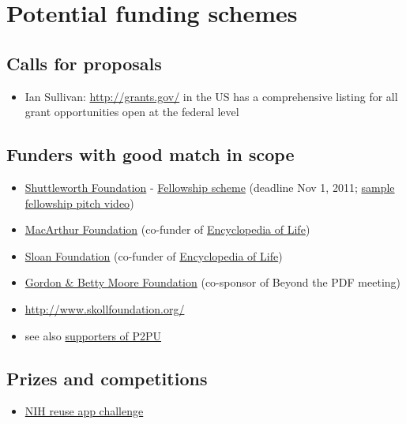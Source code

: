\documentclass[final,authoryear,3p]{elsarticle-open-drafting}
\begin{document}
\section{Potential funding schemes}
\subsection{Calls for proposals}
\begin{itemize}
	\item Ian Sullivan: \href{http://grants.gov/}{http://grants.gov/}  in the US has a comprehensive listing for all grant opportunities open at the federal level
\end{itemize}
\subsection{Funders with good match in scope}
\begin{itemize}
	\item \href{http://www.shuttleworthfoundation.org/}{Shuttleworth Foundation} - \href{http://www.shuttleworthfoundation.org/funding/fellowship-programme/}{Fellowship scheme} (deadline Nov 1, 2011; \href{http://vimeo.com/10401282}{sample fellowship pitch video})
	\item \href{http://www.macfound.org}{MacArthur Foundation} (co-funder of \href{http://www.eol.org/}{Encyclopedia of Life})
	\item \href{http://www.sloan.org/}{Sloan Foundation} (co-funder of \href{http://www.eol.org/}{Encyclopedia of Life})
	\item \href{http://www.moore.org/}{Gordon \& Betty Moore Foundation} (co-sponsor of Beyond the PDF meeting)
	\item \href{http://www.skollfoundation.org/}{http://www.skollfoundation.org/}
	\item see also \href{http://p2pu.org/general/supporters}{supporters of P2PU}
\end{itemize}
\subsection{Prizes and competitions}
\begin{itemize}
	\item \href{http://challenge.gov/NIH/132-nlm-show-off-your-apps-innovative-uses-of-nlm-information}{NIH reuse app challenge}
\end{itemize}
\end{document}
